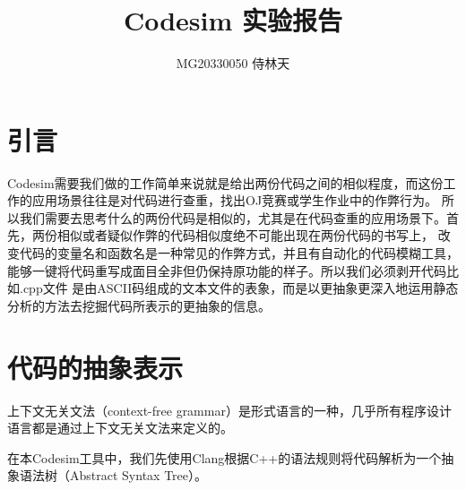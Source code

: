 \documentclass[UTF8]{article}
\begin{document}
\title{Codesim 实验报告}

\author{MG20330050 侍林天}

\maketitle

\section{引言}

Codesim需要我们做的工作简单来说就是给出两份代码之间的相似程度，而这份工作的应用场景往往是对代码进行查重，找出OJ竞赛或学生作业中的作弊行为。
所以我们需要去思考什么的两份代码是相似的，尤其是在代码查重的应用场景下。首先，两份相似或者疑似作弊的代码相似度绝不可能出现在两份代码的书写上，
改变代码的变量名和函数名是一种常见的作弊方式，并且有自动化的代码模糊工具，能够一键将代码重写成面目全非但仍保持原功能的样子。所以我们必须剥开代码比如.cpp文件
是由ASCII码组成的文本文件的表象，而是以更抽象更深入地运用静态分析的方法去挖掘代码所表示的更抽象的信息。

\section{代码的抽象表示}

上下文无关文法（context-free grammar）是形式语言的一种，几乎所有程序设计语言都是通过上下文无关文法来定义的。

在本Codesim工具中，我们先使用Clang根据C++的语法规则将代码解析为一个抽象语法树（Abstract Syntax Tree）。
\end{document}
